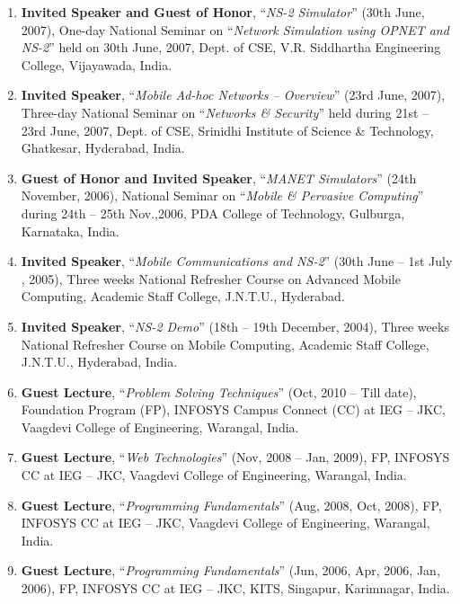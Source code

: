 \begin{enumerate}
\item
\textbf{Invited Speaker and Guest of Honor}, “\textit{NS-2 Simulator}” (30th June, 2007),  One-day National Seminar on “\textit{Network Simulation using OPNET and NS-2}” held on 30th June, 2007, Dept. of CSE, V.R. Siddhartha Engineering College, Vijayawada, India.

\item
\textbf{Invited Speaker}, “\textit{Mobile Ad-hoc Networks – Overview}” (23rd June, 2007),  Three-day National Seminar on “\textit{Networks \& Security}” held during 21st – 23rd June, 2007, Dept. of CSE, Srinidhi Institute of Science \& Technology, Ghatkesar, Hyderabad, India.

\item
\textbf{Guest of Honor and Invited Speaker}, “\textit{MANET Simulators}” (24th November, 2006), National Seminar on “\textit{Mobile \& Pervasive Computing}” during 24th – 25th Nov.,2006, PDA College of Technology, Gulburga, Karnataka, India.

\item
\textbf{Invited Speaker}, “\textit{Mobile Communications and NS-2}” (30th June – 1st  July , 2005), Three weeks National Refresher Course on Advanced Mobile Computing, Academic Staff College, J.N.T.U., Hyderabad.

\item
\textbf{Invited Speaker}, “\textit{NS-2 Demo}” (18th – 19th December, 2004), Three weeks National Refresher Course on Mobile Computing, Academic Staff College, J.N.T.U., Hyderabad, India.

\item
\textbf{Guest Lecture}, “\textit{Problem Solving Techniques}” (Oct, 2010 – Till date), Foundation Program (FP), INFOSYS Campus Connect (CC) at IEG – JKC, Vaagdevi College of Engineering, Warangal, India.

\item
\textbf{Guest Lecture}, “\textit{Web Technologies}” (Nov, 2008 – Jan, 2009), FP, INFOSYS CC at IEG – JKC, Vaagdevi College of Engineering, Warangal, India.

\item
\textbf{Guest Lecture}, “\textit{Programming Fundamentals}” (Aug, 2008, Oct, 2008), FP, INFOSYS CC at IEG – JKC, Vaagdevi College of Engineering, Warangal, India.

\item
\textbf{Guest Lecture}, “\textit{Programming Fundamentals}” (Jun, 2006, Apr, 2006, Jan, 2006), FP, INFOSYS CC at IEG – JKC,  KITS, Singapur, Karimnagar, India.



\end{enumerate}
